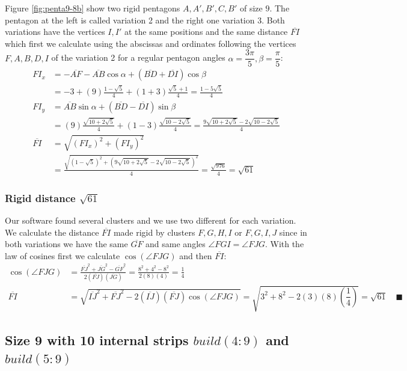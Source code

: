 \documentclass[11pt]{article}
\begin{document}
Figure \ref{fig:penta9-8b} show two rigid pentagons $A,A',B',C,B'$ of size $9$. The pentagon at the left is called variation 2 and the right one variation 3. Both variations have the vertices $I,I'$ at the same positions and the same distance $\overline{FI}$ which first we calculate using the abscissas and ordinates following the vertices $F,A,B,D,I$ of the variation 2 for a regular pentagon angles $\alpha=\dfrac{3\pi}5, \beta=\dfrac{\pi}5$:
\begin{align}
FI_x &= -\overline{AF} - \overline{AB}\cos\alpha + (\overline{BD} + \overline{DI})\cos\beta\nonumber\\
 &= -3 + (9)\frac{1-\sqrt5}4 + (1+3)\frac{\sqrt5+1}4 = \frac{1-5\sqrt5}4\\
FI_y &= \overline{AB}\sin\alpha + (\overline{BD}-\overline{DI})\sin\beta\nonumber\\
 &= (9)\frac{\sqrt{10+2\sqrt5}}4 + (1-3)\frac{\sqrt{10-2\sqrt5}}4
 = \frac{9\sqrt{10+2\sqrt5} - 2\sqrt{10-2\sqrt5}}4\\
\overline{FI} &= \sqrt{(FI_x)^2 + (FI_y)^2}\nonumber\\
 &= \frac{\sqrt{(1-\sqrt5)^2 + (9\sqrt{10+2\sqrt5} - 2\sqrt{10-2\sqrt5})^2}}4
 = \frac{\sqrt{976}}4 = \sqrt{61}
\end{align}

\subsubsection{Rigid distance $\sqrt{61}$}

Our software found several clusters and we use two different for each variation. We  calculate the distance $\overline{FI}$ made rigid by clusters $F,G,H,I$ or $F,G,I,J$ since in both variations we have the same $\overline{GF}$ and same angles $\angle{FGI}=\angle{FJG}$. With the law of cosines first we calculate $\cos(\angle{FJG})$ and then $\overline{FI}$:
\begin{align}
\cos(\angle{FJG}) &= \frac{\overline{FJ}^2 + \overline{JG}^2 - \overline{GF}^2}
 {2(\overline{FJ})(\overline{JG})}
 = \frac{8^2 + 4^2 - 8^2}{2(8)(4)} = \frac{1}4\nonumber\\
\overline{FI} &= \sqrt{\overline{IJ}^2 + \overline{FJ}^2 
 - 2(\overline{IJ})(\overline{FJ})\cos(\angle{FJG})}
 = \sqrt{3^2 + 8^2 - 2(3)(8)\left(\dfrac{1}4\right)} = \sqrt{61} \quad\blacksquare
\end{align}

\subsection{Size 9 with 10 internal strips $build(4:9)$ and $build(5:9)$}
\end{document}
